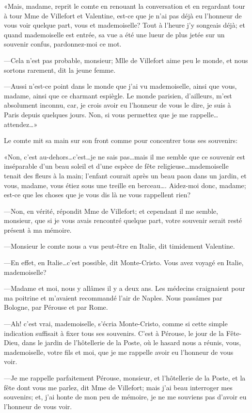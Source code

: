 «Mais, madame, reprit le comte en renouant la conversation et en regardant tour à tour Mme de Villefort et Valentine, est-ce que je n'ai pas déjà eu l'honneur de vous voir quelque part, vous et mademoiselle? Tout à l'heure j'y songeais déjà; et quand mademoiselle est entrée, sa vue a été une lueur de plus jetée sur un souvenir confus, pardonnez-moi ce mot. 

—Cela n'est pas probable, monsieur; Mlle de Villefort aime peu le monde, et nous sortons rarement, dit la jeune femme. 

—Aussi n'est-ce point dans le monde que j'ai vu mademoiselle, ainsi que vous, madame, ainsi que ce charmant espiègle. Le monde parisien, d'ailleurs, m'est absolument inconnu, car, je crois avoir eu l'honneur de vous le dire, je suis à Paris depuis quelques jours. Non, si vous permettez que je me rappelle\dots attendez\dots» 

Le comte mit sa main sur son front comme pour concentrer tous ses souvenirs: 

«Non, c'est au-dehors\dots c'est\dots je ne sais pas\dots mais il me semble que ce souvenir est inséparable d'un beau soleil et d'une espèce de fête religieuse\dots mademoiselle tenait des fleurs à la main; l'enfant courait après un beau paon dans un jardin, et vous, madame, vous étiez sous une treille en berceau\dots. Aidez-moi donc, madame; est-ce que les choses que je vous dis là ne vous rappellent rien? 

—Non, en vérité, répondit Mme de Villefort; et cependant il me semble, monsieur, que si je vous avais rencontré quelque part, votre souvenir serait resté présent à ma mémoire. 

—Monsieur le comte nous a vus peut-être en Italie, dit timidement Valentine. 

—En effet, en Italie\dots c'est possible, dit Monte-Cristo. Vous avez voyagé en Italie, mademoiselle? 

—Madame et moi, nous y allâmes il y a deux ans. Les médecins craignaient pour ma poitrine et m'avaient recommandé l'air de Naples. Nous passâmes par Bologne, par Pérouse et par Rome. 

—Ah! c'est vrai, mademoiselle, s'écria Monte-Cristo, comme si cette simple indication suffisait à fixer tous ses souvenirs. C'est à Pérouse, le jour de la Fête-Dieu, dans le jardin de l'hôtellerie de la Poste, où le hasard nous a réunis, vous, mademoiselle, votre fils et moi, que je me rappelle avoir eu l'honneur de vous voir. 

—Je me rappelle parfaitement Pérouse, monsieur, et l'hôtellerie de la Poste, et la fête dont vous me parlez, dit Mme de Villefort; mais j'ai beau interroger mes souvenirs; et, j'ai honte de mon peu de mémoire, je ne me souviens pas d'avoir eu l'honneur de vous voir. 

